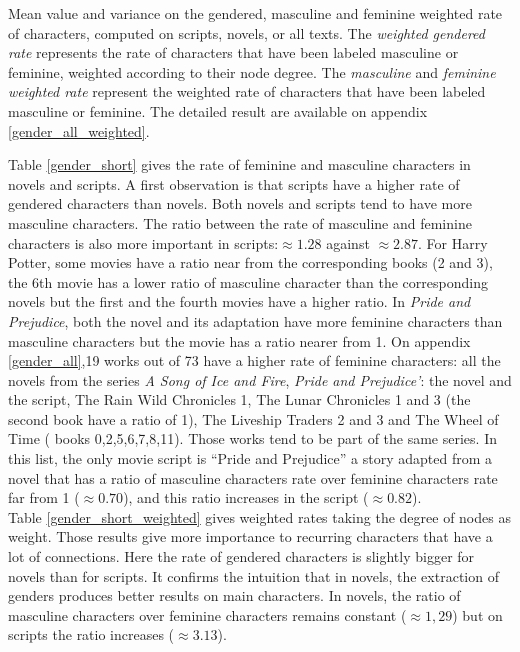 \documentclass[a4paper, 12pt]{report}
\begin{document}
\begin{table}[]
\caption{Mean value and variance on the gendered, masculine and feminine weighted rate of characters, computed on scripts, novels, or all texts. The \textit{weighted gendered rate} represents the rate of characters that have been labeled masculine or feminine, weighted according to their node degree. The \textit{masculine} and \textit{feminine weighted rate} represent the weighted rate of characters that have been labeled masculine or feminine. The detailed result are available on appendix \ref{gender_all_weighted}. }
\label{gender_short_weighted}
\end{table}

Table \ref{gender_short} gives the rate of feminine and masculine characters in novels and scripts. A first observation is that scripts have a higher rate of gendered characters than novels. Both novels and scripts tend to have more masculine characters.
The ratio between the rate of masculine and feminine characters is also more important in scripts:$\approx 1.28$ against $\approx 2.87$. For Harry Potter, some movies have a ratio near from the corresponding books (2 and 3), the 6th movie has a lower ratio of masculine character than the corresponding novels but the first and the fourth movies have a higher ratio. In \textit{Pride and Prejudice}, both the novel and its adaptation have more feminine characters than masculine characters but the movie has a ratio nearer from 1.
On appendix \ref{gender_all},19 works out of 73 have a higher rate of feminine characters: all the novels from the series \textit{A Song of Ice and Fire},  \textit{Pride and Prejudice'}: the novel and the script, The Rain Wild Chronicles 1, The Lunar Chronicles 1 and 3 (the second book have a ratio of 1), The Liveship Traders 2 and 3 and The Wheel of Time ( books 0,2,5,6,7,8,11). Those works tend to be part of the same series. In this list, the only movie script is ``Pride and Prejudice'' a story adapted from a novel that has a ratio of masculine characters rate over feminine characters rate far from 1 ($\approx 0.70$), and this ratio increases in the script ($\approx 0.82$).\\

Table \ref{gender_short_weighted} gives weighted rates taking the degree of nodes as weight. Those results give more importance to recurring characters that have a lot of connections. Here the rate of gendered characters is slightly bigger for novels than for scripts. It confirms the intuition that in novels, the extraction of genders produces better results on main characters. In novels, the ratio of masculine characters over feminine characters remains constant ($\approx 1,29$) but on scripts the ratio increases ($\approx 3.13$).\\
\end{document}
